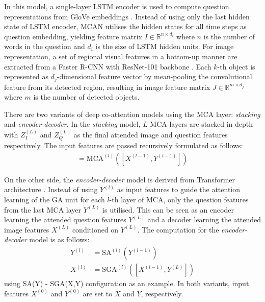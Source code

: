 \documentclass{article}
\begin{document}
In this model, a single-layer LSTM encoder \citep{lstm} is used to compute question representations from GloVe embeddings \citep{pennington2014glove}. Instead of using only the last hidden state of LSTM encoder, MCAN utilises the hidden states for all time steps as question embedding, yielding feature matrix $I \in \mathbb{R}^{n \times d_{i}}$ where $n$ is the number of words in the question and $d_{i}$ is the size of LSTM hidden units. For image representation, a set of regional visual features in a bottom-up manner \citep{Anderson_2018_CVPR} are extracted from a Faster R-CNN \citep{faster_rcnn} with ResNet-101 backbone \citep{residual}. Each $k$-th object is represented as $d_{j}$-dimensional feature vector by mean-pooling the convolutional feature from its detected region, resulting in image feature matrix $J \in \mathbb{R}^{m \times d_{j}}$ where $m$ is the number of detected objects.

There are two variants of deep co-attention models using the MCA layer: \textit{stacking} and \textit{encoder-decoder}. In the \textit{stacking} model, $L$ MCA layers are stacked in depth with $Z_{I}^{(L)}$ and $Z_{Q}^{(L)}$ as the final attended image and question features respectively. The input features are passed recursively formulated as follows:
\begin{align}
    [X^{(l)}, Y^{(l)}] = \text{MCA}^{(l)}([X^{(l-1)}, Y^{(l-1)}])
\end{align}

On the other side, the \textit{encoder-decoder} model is derived from Transformer architecture \citep{transformers}. Instead of using $Y^{(l)}$ as input features to guide the attention learning of the GA unit for each $l$-th layer of MCA, only the question features from the last MCA layer $Y^{(L)}$ is utilised. This can be seen as an encoder learning the attended question features $Y^{(L)}$ and a decoder learning the attended image features $X^{(L)}$ conditioned on $Y^{(L)}$. The computation for the \textit{encoder-decoder} model is as follows:
\begin{align}
    Y^{(l)} &= \text{SA}^{(l)}(Y^{(l-1)}) \\
    X^{(l)} &= \text{SGA}^{(l)}([X^{(l-1)}, Y^{(L)}])
\end{align}
using SA(Y) - SGA(X,Y) configuration as an example. In both variants, input features $X^{(0)}$ and $Y^{(0)} $ are set to $X$ and $Y$, respectively.
\end{document}
